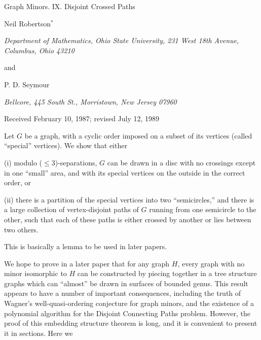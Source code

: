 {\centering
{\Large Graph Minors. IX. Disjoint Crossed Paths\par}\medskip

Neil Robertson$^*$\par
\textit{Department of Mathematics, Ohio State University, 231 West 18th Avenue, Columbus, Ohio 43210}\par
and\par
P. D. Seymour\par
\textit{Bellcore, 445 South St., Morristown, New Jersey 07960}\par
Received February 10, 1987; revised July 12, 1989\par
Let $G$ be a graph, with a cyclic order imposed on a subset of its vertices (called ``special'' vertices). We show that either\par
\hspace*{12pt}(i) modulo ($\le 3$)-separations, $G$ can be drawn in a disc with no crossings except in one ``small'' area, and with its special vertices on the outside in the correct order, or

\hspace*{12pt}(ii) there is a partition of the special vertices into two ``semicircles,'' and there is a large collection of vertex-disjoint paths of $G$ running from one semicircle to the other, such that each of these paths is either crossed by another or lies between two others.

This is basically a lemma to be used in later papers.\par
}


We hope to prove in a later paper that for any graph $H$, every graph with no minor isomorphic to $H$ can be constructed by piecing together in a tree structure graphs which can ``almost'' be drawn in surfaces of bounded genus. This result appears to have a number of important consequences, including the truth of Wagner's well-quasi-ordering conjecture for graph minors, and the existence of a polynomial algorithm for the Disjoint Connecting Paths problem. However, the proof of this embedding structure theorem is long, and it is convenient to present it in sections. Here we%
